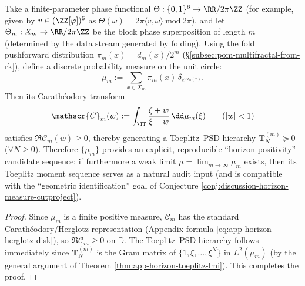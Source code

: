 \begin{proposition}\label{prop:discussion-horizon-measure-fold6-pushforward}
Take a finite-parameter phase functional \(\Theta:\{0,1\}^6\to\RR/2\pi\ZZ\) (for example, given by \(v\in(\ZZ[\varphi])^6\) as \(\Theta(\omega)=2\pi\langle v,\omega\rangle\ \mathrm{mod}\ 2\pi\)), and let \(\Theta_m:X_m\to\RR/2\pi\ZZ\) be the block phase superposition of length \(m\) (determined by the data stream generated by folding).
Using the fold pushforward distribution \(\pi_m(x)=d_m(x)/2^m\) (\S\ref{subsec:pom-multifractal-from-rk}), define a discrete probability measure on the unit circle:
\[
\mu_m:=\sum_{x\in X_m}\pi_m(x)\,\delta_{e^{\mathrm{i}\Theta_m(x)}}.
\]
Then its Carath\'eodory transform
\[
\mathscr{C}_m(w):=\int_{\TT}\frac{\xi+w}{\xi-w}\,\dd\mu_m(\xi)
\qquad(|w|<1)
\]
satisfies \(\Re\mathscr{C}_m(w)\ge 0\), thereby generating a Toeplitz--PSD hierarchy \(\mathbf{T}^{(m)}_N\succeq 0\) (\(\forall N\ge 0\)).
Therefore \(\{\mu_m\}\) provides an explicit, reproducible ``horizon positivity'' candidate sequence; if furthermore a weak limit \(\mu=\lim_{m\to\infty}\mu_m\) exists, then its Toeplitz moment sequence serves as a natural audit input (and is compatible with the ``geometric identification'' goal of Conjecture \ref{conj:discussion-horizon-measure-cutproject}).
\end{proposition}
\begin{proof}
Since \(\mu_m\) is a finite positive measure, \(\mathscr{C}_m\) has the standard Carath\'eodory/Herglotz representation (Appendix formula \eqref{eq:app-horizon-herglotz-disk}), so \(\Re\mathscr{C}_m\ge 0\) on \(\mathbb{D}\).
The Toeplitz--PSD hierarchy follows immediately since \(\mathbf{T}^{(m)}_N\) is the Gram matrix of \(\{1,\xi,\dots,\xi^N\}\) in \(L^2(\mu_m)\) (by the general argument of Theorem \ref{thm:app-horizon-toeplitz-lmi}). This completes the proof.
\end{proof}

